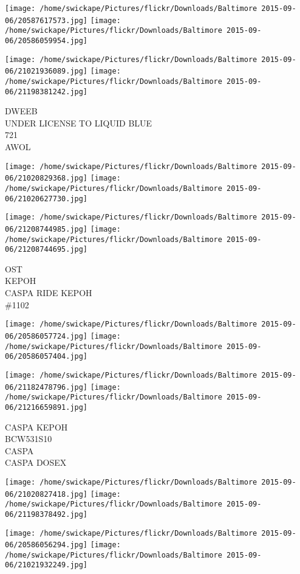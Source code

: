 \documentclass[10pt,letterpaper]{article}
\begin{document}
\texttt{[image: /home/swickape/Pictures/flickr/Downloads/Baltimore 2015-09-06/20587617573.jpg]}
\texttt{[image: /home/swickape/Pictures/flickr/Downloads/Baltimore 2015-09-06/20586059954.jpg]}

\texttt{[image: /home/swickape/Pictures/flickr/Downloads/Baltimore 2015-09-06/21021936089.jpg]}
\texttt{[image: /home/swickape/Pictures/flickr/Downloads/Baltimore 2015-09-06/21198381242.jpg]}

DWEEB\\
UNDER LICENSE TO LIQUID BLUE\\
721\\
AWOL
\pagebreak

\texttt{[image: /home/swickape/Pictures/flickr/Downloads/Baltimore 2015-09-06/21020829368.jpg]}
\texttt{[image: /home/swickape/Pictures/flickr/Downloads/Baltimore 2015-09-06/21020627730.jpg]}

\texttt{[image: /home/swickape/Pictures/flickr/Downloads/Baltimore 2015-09-06/21208744985.jpg]}
\texttt{[image: /home/swickape/Pictures/flickr/Downloads/Baltimore 2015-09-06/21208744695.jpg]}

OST\\
KEPOH\\
CASPA RIDE KEPOH\\
\#1102
\pagebreak

\texttt{[image: /home/swickape/Pictures/flickr/Downloads/Baltimore 2015-09-06/20586057724.jpg]}
\texttt{[image: /home/swickape/Pictures/flickr/Downloads/Baltimore 2015-09-06/20586057404.jpg]}

\texttt{[image: /home/swickape/Pictures/flickr/Downloads/Baltimore 2015-09-06/21182478796.jpg]}
\texttt{[image: /home/swickape/Pictures/flickr/Downloads/Baltimore 2015-09-06/21216659891.jpg]}

CASPA KEPOH\\
BCW531S10\\
CASPA\\
CASPA DOSEX
\pagebreak

\texttt{[image: /home/swickape/Pictures/flickr/Downloads/Baltimore 2015-09-06/21020827418.jpg]}
\texttt{[image: /home/swickape/Pictures/flickr/Downloads/Baltimore 2015-09-06/21198378492.jpg]}

\texttt{[image: /home/swickape/Pictures/flickr/Downloads/Baltimore 2015-09-06/20586056294.jpg]}
\texttt{[image: /home/swickape/Pictures/flickr/Downloads/Baltimore 2015-09-06/21021932249.jpg]}
\end{document}
